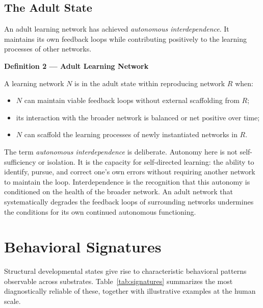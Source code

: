 \documentclass[11pt]{article}
\begin{document}
\subsection{The Adult State}

An adult learning network has achieved \emph{autonomous interdependence}. It maintains its
own feedback loops while contributing positively to the learning processes of other networks.

\begin{mdframed}
\textbf{Definition 2 --- Adult Learning Network}

A learning network $N$ is in the adult state within reproducing network $R$ when:
\begin{itemize}
    \item $N$ can maintain viable feedback loops without external scaffolding from $R$;
    \item its interaction with the broader network is balanced or net positive over time;
    \item $N$ can scaffold the learning processes of newly instantiated networks in $R$.
\end{itemize}
\end{mdframed}

The term \emph{autonomous interdependence} is deliberate. Autonomy here is not
self-sufficiency or isolation. It is the capacity for self-directed learning: the ability to
identify, pursue, and correct one's own errors without requiring another network to maintain
the loop. Interdependence is the recognition that this autonomy is conditioned on the health
of the broader network. An adult network that systematically degrades the feedback loops of
surrounding networks undermines the conditions for its own continued autonomous functioning.

\section{Behavioral Signatures}

Structural developmental states give rise to characteristic behavioral patterns observable
across substrates. Table~\ref{tab:signatures} summarizes the most diagnostically reliable
of these, together with illustrative examples at the human scale.
\end{document}
